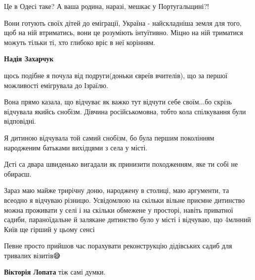 \begin{itemize}
Це в Одесі таке?
А ваша родина, наразі, мешкає у Португальщині?!

 
Вони готують своїх дітей до еміграції, Україна - найскладніша земля для того,
щоб на ній втриматись, вони це розуміють інтуїтивно. Міцно на ній триматися
можуть тільки ті, хто глибоко вріс в неї корінням.

\begin{itemize}
 
\textbf{Надія Захарчук} 

щось подібне я почула від подруги(доньки євреїв вчителів), що за першої
можливості емігрувала до Ізраїлю.

Вона прямо казала, що відчуває як важко тут відчути себе своїм...бо скрізь
відчувала якийсь снобізм. Дівчина російськомовна, тобто кола спілкування були
відповідні.

Я дитиною відчувала той самий снобізм, бо була першим поколінням народженим
батьками вихідцями з села у місті.

Дєті са двара швиденько вигадали як принизити походженням, яке ти собі не
обираєш.

Зараз маю майже трирічну доню, народжену в столиці, маю аргументи, та всеодно я
відчуваю різницю. Усвідомлюю на скільки вільне приємне дитинство можна
проживати у селі і на скільки обмежене у просторі, навіть приватної садиби,
параноїдальне й залякане дитинство було у місті і відчуваю, що 4млнний Київ ще
гірший у цьому сенсі🤦

Певне просто прийшов час порахувати реконструкцію дідівських садиб для тривалих візитів😅

 
\textbf{Вікторія Лопата} тіж самі думки.

 

\end{itemize}
\end{itemize}
